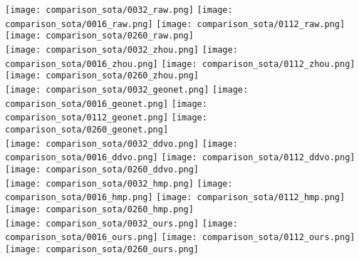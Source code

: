\documentclass[letterpaper]{article} \usepackage{aaai19}  \usepackage{times}  \usepackage{helvet}  \usepackage{courier}  \usepackage{url}  \usepackage{graphicx}  \frenchspacing
\begin{document}
\begin{figure*}[t]
    \centering
    {}
    \texttt{[image: comparison\_sota/0032\_raw.png]}
    \texttt{[image: comparison\_sota/0016\_raw.png]}
    \texttt{[image: comparison\_sota/0112\_raw.png]}
    \texttt{[image: comparison\_sota/0260\_raw.png]}\\
   
    {}
    \texttt{[image: comparison\_sota/0032\_zhou.png]}
    \texttt{[image: comparison\_sota/0016\_zhou.png]}
    \texttt{[image: comparison\_sota/0112\_zhou.png]}
    \texttt{[image: comparison\_sota/0260\_zhou.png]}\\
   
    {}
    \texttt{[image: comparison\_sota/0032\_geonet.png]}
    \texttt{[image: comparison\_sota/0016\_geonet.png]}
    \texttt{[image: comparison\_sota/0112\_geonet.png]}
    \texttt{[image: comparison\_sota/0260\_geonet.png]}\\
   
    {}
    \texttt{[image: comparison\_sota/0032\_ddvo.png]}
    \texttt{[image: comparison\_sota/0016\_ddvo.png]}
    \texttt{[image: comparison\_sota/0112\_ddvo.png]}
    \texttt{[image: comparison\_sota/0260\_ddvo.png]}\\
   
    {}
    \texttt{[image: comparison\_sota/0032\_hmp.png]}
    \texttt{[image: comparison\_sota/0016\_hmp.png]}
    \texttt{[image: comparison\_sota/0112\_hmp.png]}
    \texttt{[image: comparison\_sota/0260\_hmp.png]}\\
   
    {}
    \texttt{[image: comparison\_sota/0032\_ours.png]}
    \texttt{[image: comparison\_sota/0016\_ours.png]}
    \texttt{[image: comparison\_sota/0112\_ours.png]}
    \texttt{[image: comparison\_sota/0260\_ours.png]}\\
   

\end{figure*}
\end{document}
